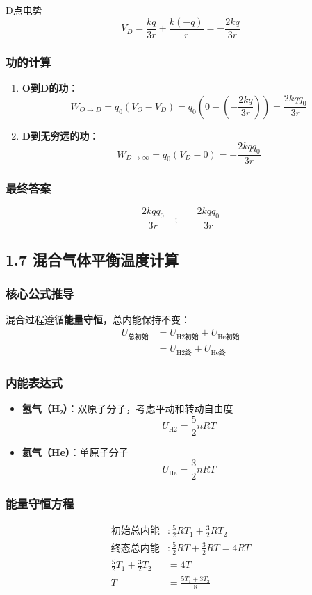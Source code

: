 \documentclass{article}
\begin{document}
{D点电势
\[
V_D = \frac{kq}{3r} + \frac{k(-q)}{r} = -\frac{2kq}{3r}
\]

\subsubsection*{功的计算}
\begin{enumerate}
  \item \textbf{O到D的功}：
  \[
  W_{O→D} = q_0(V_O - V_D) = q_0\left(0 - \left(-\frac{2kq}{3r}\right)\right) = \frac{2k q q_0}{3r}
  \]
  
  \item \textbf{D到无穷远的功}：
  \[
  W_{D→∞} = q_0(V_D - 0) = -\frac{2k q q_0}{3r}
  \]
\end{enumerate}

\subsubsection*{最终答案}
\[
\boxed{\dfrac{2k q q_0}{3r}} \quad ; \quad \boxed{-\dfrac{2k q q_0}{3r}}
\]

\subsection*{1.7 混合气体平衡温度计算}


\subsubsection*{核心公式推导}
混合过程遵循\textbf{能量守恒}，总内能保持不变：
\begin{align*}
    U_{\text{总初始}} &= U_{\text{H2初始}} + U_{\text{He初始}} \\
    &= U_{\text{H2终}} + U_{\text{He终}}
\end{align*}

\subsubsection*{内能表达式}
\begin{itemize}
    \item \textbf{氢气（H₂）}：双原子分子，考虑平动和转动自由度
    \[
        U_{\text{H2}} = \frac{5}{2}nRT
    \]
    
    \item \textbf{氦气（He）}：单原子分子
    \[
        U_{\text{He}} = \frac{3}{2}nRT
    \]
\end{itemize}

\subsubsection*{能量守恒方程}
\begin{align*}
    \text{初始总内能} &: \frac{5}{2}RT_1 + \frac{3}{2}RT_2 \\
    \text{终态总内能} &: \frac{5}{2}RT + \frac{3}{2}RT = 4RT \\
    \frac{5}{2}T_1 + \frac{3}{2}T_2 &= 4T \\
    T &= \boxed{\frac{5T_1 + 3T_2}{8}}
\end{align*}

}
\end{document}
